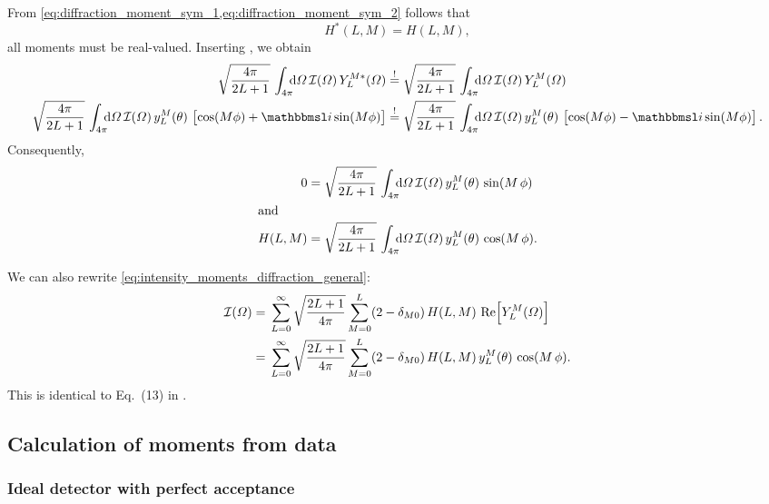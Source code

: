 From \cref{eq:diffraction_moment_sym_1,eq:diffraction_moment_sym_2} follows that
\begin{equation}
  H^*(L, M) = H(L, M),
\end{equation}
\ie all moments must be real-valued.  Inserting
, we obtain
\begin{align}
  \sqrt{\frac{4 \pi}{2 L + 1}}\, \int_{4 \pi}\!\!\! \dif{\Omega}\, \mathcal{I}(\Omega)\, Y_L^{M *}(\Omega)
  \mustBeEq{}&
  \sqrt{\frac{4 \pi}{2 L + 1}}\, \int_{4 \pi}\!\!\! \dif{\Omega}\, \mathcal{I}(\Omega)\, Y_L^M(\Omega) \\
  \sqrt{\frac{4 \pi}{2 L + 1}}\, \int_{4 \pi}\!\!\! \dif{\Omega}\, \mathcal{I}(\Omega)\, y_L^M(\theta)\, \sBrk{\cos(M \phi) + \imag \sin(M \phi)}
  \mustBeEq{}&
  \sqrt{\frac{4 \pi}{2 L + 1}}\, \int_{4 \pi}\!\!\! \dif{\Omega}\, \mathcal{I}(\Omega)\, y_L^M(\theta)\, \sBrk{\cos(M \phi) - \imag \sin(M \phi)}.
\end{align}
Consequently,
\begin{align}
  \label{eq:moments_diffraction_imag}
  0
  ={}& \sqrt{\frac{4 \pi}{2 L + 1}}\, \int_{4 \pi}\!\!\! \dif{\Omega}\, \mathcal{I}(\Omega)\, y_L^M(\theta)\, \sin(M\, \phi) \\
  \intertext{and}
  \label{eq:moments_diffraction_real}
  H(L, M)
  ={}& \sqrt{\frac{4 \pi}{2 L + 1}}\, \int_{4 \pi}\!\!\! \dif{\Omega}\, \mathcal{I}(\Omega)\, y_L^M(\theta)\, \cos(M\, \phi).
\end{align}

We can also rewrite \cref{eq:intensity_moments_diffraction_general}:
\begin{align}
  \mathcal{I}(\Omega)
  ={}& \sum_{L = 0}^\infty \sqrt{\frac{2 L + 1}{4 \pi}} \sum_{M = 0}^{L} (2 - \delta_{M 0})\, H(L, M)\, \Re\!\sBrk{Y_L^M(\Omega)} \notag
  \\
  \label{eq:intensity_moments_diffraction_real}
  ={}& \sum_{L = 0}^\infty \sqrt{\frac{2 L + 1}{4 \pi}} \sum_{M = 0}^{L} (2 - \delta_{M 0})\, H(L, M)\, y_L^M(\theta)\, \cos(M\, \phi).
\end{align}
This is identical to Eq.~(13) in .


\subsection{Calculation of moments from data}%
\label{sec:diffraction:moments_data}

\subsubsection{Ideal detector with perfect acceptance}%
\label{sec:diffraction:moments_data_no_acc}

